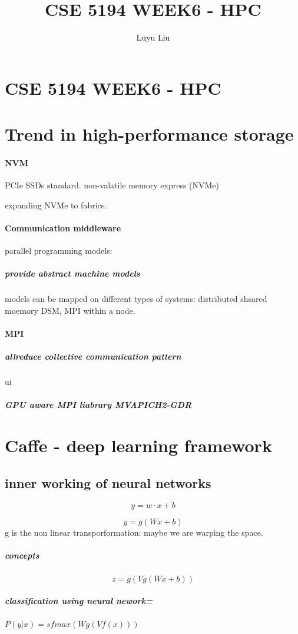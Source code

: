 \documentclass[12pt]{article}
\begin{document}
\author{Luyu Liu}

\newcommand\para{\par\refstepcounter{para}\thepara\space}

\section*{CSE 5194 WEEK6 - HPC}
\title{CSE 5194 WEEK6 - HPC}
\section{Trend in high-performance storage}

\paragraph{NVM}
PCIe SSDs standard. non-valatile memory express (NVMe)

expanding NVMe to fabrics.

\paragraph{Communication middleware}
parallel programming models:
\subparagraph{provide abstract machine models}
models can be mapped on different types of systems: distributed shsared moemory DSM, MPI within a node.

\paragraph{MPI}

\subparagraph{allreduce collective communication pattern}
ui
\subparagraph{GPU aware MPI liabrary MVAPICH2-GDR}

\section{Caffe - deep learning framework}
\subsection{inner working of neural networks}
$$y = w \cdot x + b$$

$$y = g(Wx + b)$$
g is the non linear transporformation: maybe we are warping the space.

\subparagraph{concepts}
$$z = g(Vg(Wx+b))$$

\subparagraph{classification using neural nework=}

$P(y|x) = sfmax(Wg(Vf(x)))$
\end{document}
